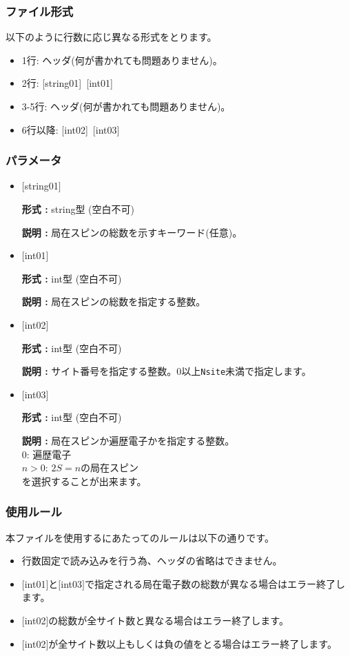 \subsubsection{ファイル形式}
以下のように行数に応じ異なる形式をとります。
 \begin{itemize}
   \item  1行:  ヘッダ(何が書かれても問題ありません)。
   \item  2行:   [string01]~[int01]
   \item  3-5行:  ヘッダ(何が書かれても問題ありません)。
   \item  6行以降:  [int02]~[int03]
  \end{itemize}
 \subsubsection{パラメータ}
 \begin{itemize}

 \item  $[$string01$]$

 {\bf 形式 :} string型 (空白不可)

{\bf 説明 :} 局在スピンの総数を示すキーワード(任意)。


  \item  $[$int01$]$

 {\bf 形式 :} int型 (空白不可)

{\bf 説明 :} 局在スピンの総数を指定する整数。

 
  \item  $[$int02$]$

 {\bf 形式 :} int型 (空白不可)

{\bf 説明 :} サイト番号を指定する整数。0以上\verb|Nsite|{未満}で指定します。

 
  \item  $[$int03$]$

 {\bf 形式 :} int型 (空白不可)

{\bf 説明 :} 局在スピンか遍歴電子かを指定する整数。\\
{
0: 遍歴電子\\
$n>0$: $2S=n$の局在スピン\\
}
を選択することが出来ます。
 \end{itemize}

\subsubsection{使用ルール}
本ファイルを使用するにあたってのルールは以下の通りです。
\begin{itemize}
\item 行数固定で読み込みを行う為、ヘッダの省略はできません。
\item $[$int01$]$と$[$int03$]$で指定される局在電子数の総数が異なる場合はエラー終了します。
\item $[$int02$]$の総数が全サイト数と異なる場合はエラー終了します。
\item $[$int02$]$が全サイト数以上もしくは負の値をとる場合はエラー終了します。
\end{itemize}



